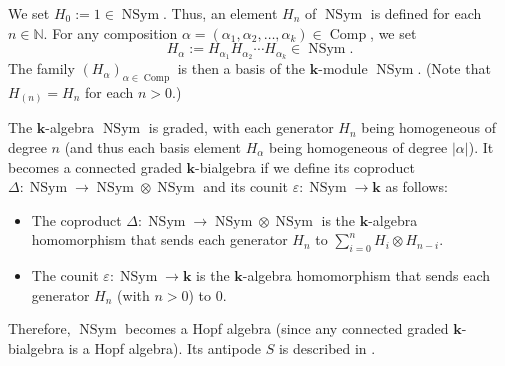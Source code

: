 \documentclass[numbers=enddot,12pt,final,onecolumn,notitlepage]{scrartcl}%
\theoremstyle{definition}
\let\sumnonlimits\sum
\renewcommand{\sum}{\sumnonlimits\limits}
\begin{document}
We set $H_{0}:=1\in\operatorname*{NSym}$. Thus, an element $H_{n}$ of
$\operatorname*{NSym}$ is defined for each $n\in\mathbb{N}$. For any
composition $\alpha=\left(  \alpha_{1},\alpha_{2},\ldots,\alpha_{k}\right)
\in\operatorname*{Comp}$, we set%
\[
H_{\alpha}:=H_{\alpha_{1}}H_{\alpha_{2}}\cdots H_{\alpha_{k}}\in
\operatorname*{NSym}.
\]
The family $\left(  H_{\alpha}\right)  _{\alpha\in\operatorname*{Comp}}$ is
then a basis of the $\mathbf{k}$-module $\operatorname*{NSym}$. (Note that
$H_{\left(  n\right)  }=H_{n}$ for each $n>0$.)

The $\mathbf{k}$-algebra $\operatorname*{NSym}$ is graded, with each generator
$H_{n}$ being homogeneous of degree $n$ (and thus each basis element
$H_{\alpha}$ being homogeneous of degree $\left\vert \alpha\right\vert $). It
becomes a connected graded $\mathbf{k}$-bialgebra if we define its coproduct
$\Delta:\operatorname*{NSym}\rightarrow\operatorname*{NSym}\otimes
\operatorname*{NSym}$ and its counit $\varepsilon:\operatorname*{NSym}%
\rightarrow\mathbf{k}$ as follows:

\begin{itemize}
\item The coproduct $\Delta:\operatorname*{NSym}\rightarrow
\operatorname*{NSym}\otimes\operatorname*{NSym}$ is the $\mathbf{k}$-algebra
homomorphism that sends each generator $H_{n}$ to $\sum_{i=0}^{n}H_{i}\otimes
H_{n-i}$.

\item The counit $\varepsilon:\operatorname*{NSym}\rightarrow\mathbf{k}$ is
the $\mathbf{k}$-algebra homomorphism that sends each generator $H_{n}$ (with
$n>0$) to $0$.
\end{itemize}

Therefore, $\operatorname*{NSym}$ becomes a Hopf algebra (since any connected
graded $\mathbf{k}$-bialgebra is a Hopf algebra). Its antipode $S$ is
described in \cite[(5.4.12)]{GriRei}.
\end{document}

